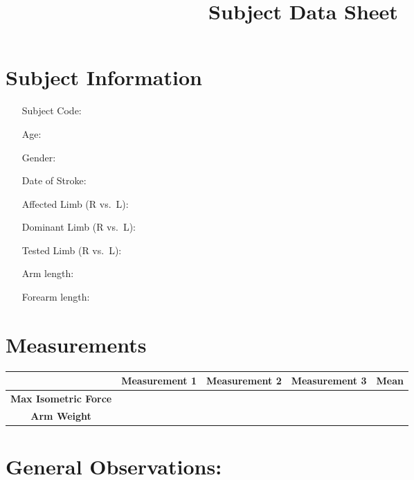 \documentclass[11pt]{article}
\begin{document}
\title{Subject Data Sheet}

\maketitle
\section*{Subject Information}
\begin{itemize}[leftmargin=2in]
\item[Subject Code:]
\item[Age:]
\item[Gender:]
\item[Date of Stroke:]
\item[Affected Limb (R vs.\ L):]
\item[Dominant Limb (R vs.\ L):]
\item[Tested Limb (R vs.\ L):]
\item[Arm length:]
\item[Forearm length:] 

\end{itemize}
\section*{Measurements}
\begin{table}[!h]
\centering
\begin{tabular}{c | c | c | c | c}
&\textbf{Measurement 1} & \textbf{Measurement 2} & \textbf{Measurement 3} & \textbf{Mean} \\
\hline
\multirow{2}{*}{\textbf{Max Isometric Force}}& & & &\\
& & &\\
\hline
\multirow{2}{*}{\textbf{Arm Weight}}& & & &\\
& & &
\end{tabular}
\end{table}
\section*{General Observations:}
\end{document}
